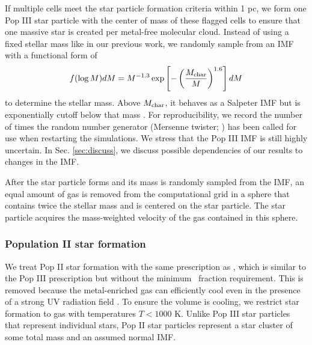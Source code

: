\documentclass[12pt,preprint]{aastex}
\begin{document}
If multiple cells meet the star particle formation criteria within 1
pc, we form one Pop III star particle with the center of mass of these
flagged cells to ensure that one massive star is created per
metal-free molecular cloud.  Instead of using a fixed stellar mass
like in our previous work, we randomly sample from an IMF with a
functional form of
%
\begin{equation}
\label{eqn:imf}
f(\log M) dM = M^{-1.3} \exp\left[-\left(\frac{M_{\rm
      char}}{M}\right)^{1.6}\right] dM
\end{equation}
%
to determine the stellar mass.  Above $M_{\rm char}$, it behaves as a
Salpeter IMF but is exponentially cutoff below that mass
\citep{Chabrier03, Clark09}.  For reproducibility, we record the
number of times the random number generator (Mersenne twister;
\citet{MTwister}) has been called for use when restarting the
simulations.  We stress that the Pop III IMF is still highly
uncertain.  In Sec. \ref{sec:discuss}, we discuss possible
dependencies of our results to changes in the IMF.  

After the star particle forms and its mass is randomly sampled from
the IMF, an equal amount of gas is removed from the computational grid
in a sphere that contains twice the stellar mass and is centered on
the star particle.  The star particle acquires the mass-weighted
velocity of the gas contained in this sphere.

%

\subsubsection{Population II star formation}

We treat Pop II star formation with the same prescription as
\citet{Wise09}, which is similar to the Pop III prescription but
without the minimum \hh~fraction requirement.  This is removed because
the metal-enriched gas can efficiently cool even in the presence of a
strong UV radiation field \citep[e.g.][]{Safranek10}.  To ensure the
volume is cooling, we restrict star formation to gas with temperatures
$T < 1000$ K.  Unlike Pop III star particles that represent individual
stars, Pop II star particles represent a star cluster of some total
mass and an assumed normal IMF.
\end{document}
